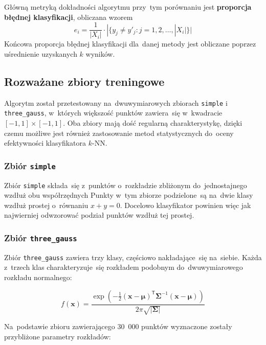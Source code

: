 \documentclass[11pt,a4paper]{article}
\begin{document}
Główną metryką dokładności algorytmu przy~tym porównaniu jest \textbf{proporcja błędnej klasyfikacji}, obliczana wzorem
$$ e_i = \frac{1}{|X_i|} \cdot | \{ y_j \neq y'_j : j = 1,2,\dots,|X_i| \} | $$
Końcowa proporcja błędnej klasyfikacji dla~danej metody jest obliczane poprzez uśrednienie uzyskanych $k$ wyników.

\subsection{Rozważane zbiory treningowe}

Algorytm został przetestowany na~dwuwymiarowych zbiorach {\tt simple} i {\tt three\_gauss}, w~których większość punktów zawiera~się w~kwadracie $[-1,1] \times [-1,1]$.
Oba zbiory mają dość regularną charakterystykę, dzięki czemu możliwe jest również zastosowanie metod statystycznych do~oceny efektywności klasyfikatora $k$-NN.

\subsubsection{Zbiór {\tt simple}}

Zbiór {\tt simple} składa~się z~punktów o~rozkładzie zbliżonym do~jednostajnego wzdłuż obu współrzędnych
Punkty w~tym zbiorze podzielone~są na~dwie klasy wzdłuż prostej o~równaniu $x + y = 0$.
Docelowo klasyfikator powinien więc jak najwierniej odwzorować podział punktów wzdłuż tej prostej.

\subsubsection{Zbiór {\tt three\_gauss}}

Zbiór {\tt three\_gauss} zawiera trzy klasy, częściowo nakładające~się na~siebie.
Każda z~trzech klas charakteryzuje~się rozkładem podobnym do~dwuwymiarowego rozkładu normalnego:

$$ f(\mathbf{x}) = \frac{\exp \left( -\frac{1}{2} (\mathbf{x} - \boldsymbol\mu)^\mathsf{T} \boldsymbol\Sigma^{-1} (\mathbf{x} - \boldsymbol\mu) \right)}{2\pi \sqrt{|\boldsymbol\Sigma|}} $$

Na~podstawie zbioru zawierającego 30~000 punktów wyznaczone zostały przybliżone parametry rozkładów:
\end{document}
